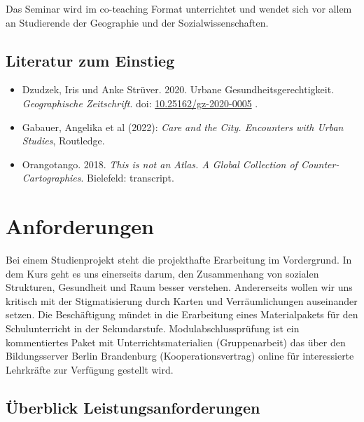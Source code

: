 \documentclass[
  ngerman,
]{article}
\providecommand{\tightlist}{%
  \setlength{\itemsep}{0pt}\setlength{\parskip}{0pt}}
\begin{document}
Das Seminar wird im co-teaching Format unterrichtet und wendet sich vor allem an Studierende der Geographie und der Sozialwissenschaften.

\hypertarget{literatur-zum-einstieg}{%
\subsection*{Literatur zum Einstieg}\label{literatur-zum-einstieg}}

\begin{itemize}
\tightlist
\item
  Dzudzek, Iris und Anke Strüver. 2020. Urbane Gesundheitsgerechtigkeit. \emph{Geographische Zeitschrift}. doi: \href{https://doi.org/10.25162/gz-2020-0005}{10.25162/gz-2020-0005} .
\item
  Gabauer, Angelika et al (2022): \emph{Care and the City. Encounters with Urban Studies}, Routledge.
\item
  Orangotango. 2018. \emph{This is not an Atlas. A Global Collection of Counter-Cartographies}. Bielefeld: transcript.
\end{itemize}

\newpage

\hypertarget{anforderungen}{%
\section*{Anforderungen}\label{anforderungen}}

Bei einem Studienprojekt steht die projekthafte Erarbeitung im Vordergrund. In dem Kurs geht es uns einerseits darum, den Zusammenhang von sozialen Strukturen, Gesundheit und Raum besser verstehen. Andererseits wollen wir uns kritisch mit der Stigmatisierung durch Karten und Verräumlichungen auseinander setzen. Die Beschäftigung mündet in die Erarbeitung eines Materialpakets für den Schulunterricht in der Sekundarstufe. Modulabschlussprüfung ist ein kommentiertes Paket mit Unterrichtsmaterialien (Gruppenarbeit) das über den Bildungsserver Berlin Brandenburg (Kooperationsvertrag) online für interessierte Lehrkräfte zur Verfügung gestellt wird.

\hypertarget{uxfcberblick-leistungsanforderungen}{%
\subsection*{Überblick Leistungsanforderungen}\label{uxfcberblick-leistungsanforderungen}}
\end{document}
